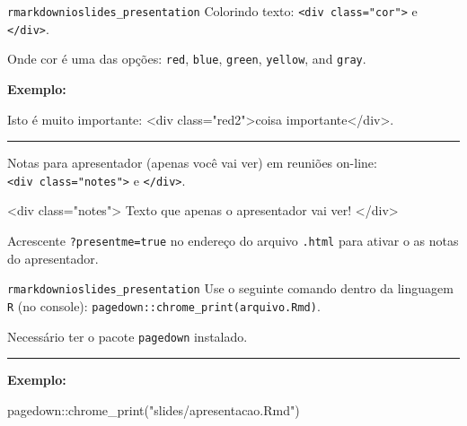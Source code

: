 \documentclass[
  10pt,
  ignorenonframetext,
]{beamer}
\newenvironment{Shaded}{\begin{snugshade}}{\end{snugshade}}
\newcommand{\ErrorTok}[1]{\textcolor[rgb]{0.68,0.00,0.00}{#1}}
\newcommand{\FunctionTok}[1]{\textcolor[rgb]{0.28,0.35,0.67}{#1}}
\newcommand{\KeywordTok}[1]{\textcolor[rgb]{0.00,0.23,0.31}{#1}}
\newcommand{\NormalTok}[1]{\textcolor[rgb]{0.00,0.23,0.31}{#1}}
\newcommand{\OtherTok}[1]{\textcolor[rgb]{0.00,0.23,0.31}{#1}}
\newcommand{\SpecialCharTok}[1]{\textcolor[rgb]{0.37,0.37,0.37}{#1}}
\newcommand{\StringTok}[1]{\textcolor[rgb]{0.13,0.47,0.30}{#1}}
\newcommand*{\regrafina}{\rule{\textwidth}{0.5pt}}
\begin{document}
\begin{frame}[fragile]{\texttt{rmarkdown}\newline \texttt{ioslides\_presentation}}
\protect\hypertarget{rmarkdownioslides_presentation-9}{}
Colorindo texto: \texttt{\textless{}div\ class="cor"\textgreater{}} e
\texttt{\textless{}/div\textgreater{}}.

Onde cor é uma das opções: \texttt{red}, \texttt{blue}, \texttt{green},
\texttt{yellow}, and \texttt{gray}.

\textbf{Exemplo:}

\small

\begin{Shaded}
\begin{Highlighting}[]
\NormalTok{Isto é muito importante: }\KeywordTok{\textless{}div} \ErrorTok{class}\OtherTok{=}\StringTok{"red2"}\KeywordTok{\textgreater{}}\NormalTok{coisa importante}\KeywordTok{\textless{}/div\textgreater{}}\NormalTok{.}
\end{Highlighting}
\end{Shaded}

\normalsize

\regrafina

Notas para apresentador (apenas você vai ver) em reuniões on-line:
\texttt{\textless{}div\ class="notes"\textgreater{}} e
\texttt{\textless{}/div\textgreater{}}.

\begin{Shaded}
\begin{Highlighting}[]
\KeywordTok{\textless{}div} \ErrorTok{class}\OtherTok{=}\StringTok{"notes"}\KeywordTok{\textgreater{}}
\NormalTok{Texto que apenas o apresentador vai ver!}
\KeywordTok{\textless{}/div\textgreater{}}
\end{Highlighting}
\end{Shaded}

\textcolor{titulo}{Acrescente \texttt{?presentme=true} no endereço do arquivo \texttt{.html} para ativar o as notas do apresentador.}
\end{frame}

\begin{frame}[fragile]{\texttt{rmarkdown}\newline \texttt{ioslides\_presentation}}
\protect\hypertarget{rmarkdownioslides_presentation-10}{}
Use o seguinte comando dentro da linguagem \texttt{R} (no console):
\texttt{pagedown::chrome\_print(\textquotesingle{}arquivo.Rmd\textquotesingle{})}.

\colorbox{cabecalho}{\textcolor{titulo}{Necessário ter o pacote \texttt{pagedown} instalado.}}

\regrafina

\textbf{Exemplo:}

\begin{Shaded}
\begin{Highlighting}[]
\NormalTok{pagedown}\SpecialCharTok{::}\FunctionTok{chrome\_print}\NormalTok{(}\StringTok{"slides/apresentacao.Rmd"}\NormalTok{)}
\end{Highlighting}
\end{Shaded}
\end{frame}
\end{document}
